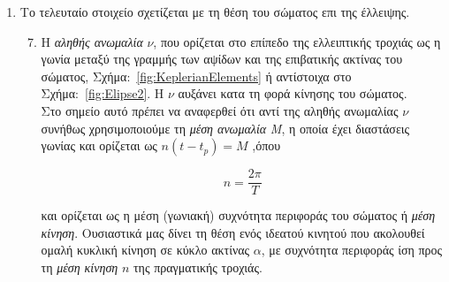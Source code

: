 \begin{enumerate}
\begin{enumerate}
  \item Το {\it μήκος του αναβιβάζοντος συνδέσμου}, $\Omega$, το οποίο ορίζεται στο επίπεδο αναφοράς $x-y$ (εκλειπτική) ως η γωνία μεταξύ του άξονα {\en Ox} και της γραμμής των συνδέσμων. Η γραμμή των συνδέσμων αποτελεί την τομή μεταξύ του επιπέδου αναφοράς $x-y$ (εκλειπτική) και της έλλειψης (επίπεδο της τροχίας του σώματος), Σχήμα:~\ref{fig:KeplerianElements}. Ο άξονας {\en Ox} συνήθως επιλέγεται ώστε να συμπίπτει με τη διεύθυνση του μέσου εαρινού σημείου {\it γ}\footnote{Το σημείο της Ουράνιας Σφαίρας στο οποίο φαίνεται να βρίσκεται ο Ήλιος απο τη Γή κατα τη στιγμή της {\it εαρινής ισημερίας} του Βόρειου Ημισφαιρίου της}.
  
  \item Το {\it όρισμα του περιηλίου}, $\omega$, που ορίζεται στο επίπεδο της ελλειπτικής τροχιάς ως η γωνία μεταξύ της γραμμής των συνδέσμων και της θέσης του περιηλίου της τροχιάς, Σχήμα:~\ref{fig:KeplerianElements} .
 \end{enumerate}

 \item Το τελευταίο στοιχείο σχετίζεται με τη θέση του σώματος επι της έλλειψης.
 
 \begin{enumerate}
 \setcounter{enumii}{6} 
   \item Η {\it αληθής ανωμαλία} $\nu$, που ορίζεται στο επίπεδο της ελλειπτικής τροχιάς ως η γωνία μεταξύ της γραμμής των αψίδων και της επιβατικής ακτίνας του σώματος, Σχήμα:~\ref{fig:KeplerianElements} ή αντίστοιχα στο Σχήμα:~\ref{fig:Elipse2}. Η $\nu$ αυξάνει κατα τη φορά κίνησης του σώματος.\\
 Στο σημείο αυτό πρέπει να αναφερθεί ότι αντί της αληθής ανωμαλίας $\nu$ συνήθως χρησιμοποιούμε τη {\it μέση ανωμαλία} {\it Μ}, η οποία έχει διαστάσεις γωνίας και ορίζεται ως $n(t-t_p) = M$ ,όπου
 
 
 \begin{equation}\label{eq:MeanMotion}
  n= \frac{2\pi}{Τ}
 \end{equation}

\vspace{0.3cm}  
  
και ορίζεται ως η μέση (γωνιακή) συχνότητα περιφοράς του σώματος ή {\it μέση κίνηση}. Ουσιαστικά μας δίνει τη θέση ενός ιδεατού κινητού που ακολουθεί ομαλή κυκλική κίνηση σε κύκλο ακτίνας $\alpha$, με συχνότητα περιφοράς ίση προς τη {\it μέση κίνηση} $n$ της πραγματικής τροχιάς.
 \end{enumerate}
\end{enumerate}

